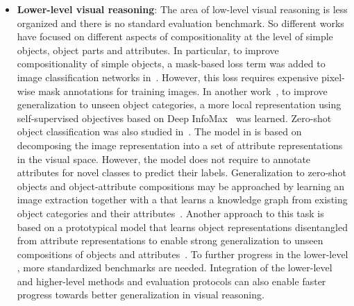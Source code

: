 \begin{itemize}[leftmargin=5mm]
    \item %
    \textbf{Lower-level visual reasoning}: The area of low-level visual reasoning is less organized and there is no standard evaluation benchmark. So different works have focused on different aspects of compositionality at the level of simple objects, object parts and attributes. In particular, to improve compositionality of simple objects, a mask-based loss term was added to image classification networks in~\citep{stone2017teaching}. However, this loss requires expensive pixel-wise mask annotations for training images. 
    In another work~\citep{sylvain2019locality}, to improve generalization to unseen object categories, a more local representation using self-supervised objectives based on Deep InfoMax~\citep{hjelm2018learning} was learned. 
    Zero-shot object classification was also studied in~\citep{tokmakov2019learning}. The model in \citep{tokmakov2019learning} is based on decomposing the image representation into a set of attribute representations in the visual space. However, the model does not require to annotate attributes for novel classes to predict their labels.
    Generalization to zero-shot objects and object-attribute compositions may be approached by learning an image extraction \cnn together with a \gnn that learns a knowledge graph from existing object categories and their attributes~\citep{naeem2021learning}. 
    Another approach to this task is based on a prototypical model that learns object representations disentangled from attribute representations to enable strong generalization to unseen compositions of objects and attributes~\citep{ruis2021independent}. To further progress in the lower-level \cgshort, more standardized benchmarks are needed. Integration of the lower-level and higher-level \cgshort methods and evaluation protocols can also enable faster progress towards better generalization in visual reasoning.
    

\end{itemize}
